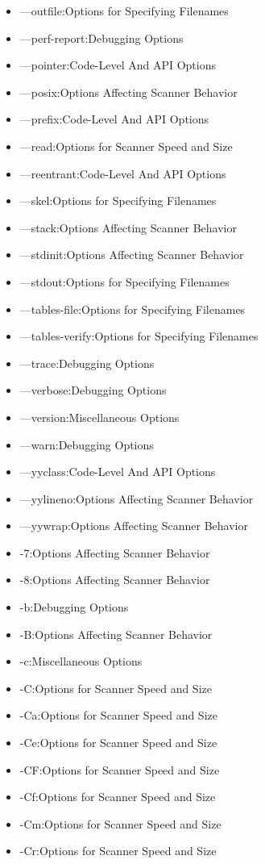 \documentclass[openany,oneside]{book}
\begin{document}
\begin{itemize}
\item —outfile:Options for Specifying Filenames
\item —perf-report:Debugging Options
\item —pointer:Code-Level And API Options
\item —posix:Options Affecting Scanner Behavior
\item —prefix:Code-Level And API Options
\item —read:Options for Scanner Speed and Size
\item —reentrant:Code-Level And API Options
\item —skel:Options for Specifying Filenames
\item —stack:Options Affecting Scanner Behavior
\item —stdinit:Options Affecting Scanner Behavior
\item —stdout:Options for Specifying Filenames
\item —tables-file:Options for Specifying Filenames
\item —tables-verify:Options for Specifying Filenames
\item —trace:Debugging Options
\item —verbose:Debugging Options
\item —version:Miscellaneous Options
\item —warn:Debugging Options
\item —yyclass:Code-Level And API Options
\item —yylineno:Options Affecting Scanner Behavior
\item —yywrap:Options Affecting Scanner Behavior
\item -7:Options Affecting Scanner Behavior
\item -8:Options Affecting Scanner Behavior
\item -b:Debugging Options
\item -B:Options Affecting Scanner Behavior
\item -c:Miscellaneous Options
\item -C:Options for Scanner Speed and Size
\item -Ca:Options for Scanner Speed and Size
\item -Ce:Options for Scanner Speed and Size
\item -CF:Options for Scanner Speed and Size
\item -Cf:Options for Scanner Speed and Size
\item -Cm:Options for Scanner Speed and Size
\item -Cr:Options for Scanner Speed and Size

\end{itemize}
\end{document}
